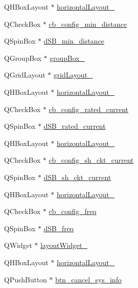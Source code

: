 \begin{DoxyCompactItemize}
\item 
Q\+H\+Box\+Layout $\ast$ \hyperlink{a00027_a8ead8fc876ee91c30864822eedb9c370}{horizontal\+Layout\+\_}
\item 
Q\+Check\+Box $\ast$ \hyperlink{a00027_a6b0d09f3b380fdb810d3da3f5208ccf5}{cb\+\_\+config\+\_\+min\+\_\+distance}
\item 
Q\+Spin\+Box $\ast$ \hyperlink{a00027_a01c23085590f4947828948bbd9f50cc7}{d\+S\+B\+\_\+min\+\_\+distance}
\item 
Q\+Group\+Box $\ast$ \hyperlink{a00027_a269faaef68e4ad4784635810fcae5698}{group\+Box\+\_}
\item 
Q\+Grid\+Layout $\ast$ \hyperlink{a00027_a20728ed83bf740332bd908ea3e15ace6}{grid\+Layout\+\_}
\item 
Q\+H\+Box\+Layout $\ast$ \hyperlink{a00027_ab48e49d68609b4c66e5169e2f87e3eb9}{horizontal\+Layout\+\_}
\item 
Q\+Check\+Box $\ast$ \hyperlink{a00027_af4863849ff58931ae3a38aa5b40b8158}{cb\+\_\+config\+\_\+rated\+\_\+current}
\item 
Q\+Spin\+Box $\ast$ \hyperlink{a00027_ab6d7c3a292c79cd73aff8735df48d30e}{d\+S\+B\+\_\+rated\+\_\+current}
\item 
Q\+H\+Box\+Layout $\ast$ \hyperlink{a00027_af1a7bbeee705545b94c55c297299118d}{horizontal\+Layout\+\_}
\item 
Q\+Check\+Box $\ast$ \hyperlink{a00027_a541de6e510677e572ab233f7ecc25e2c}{cb\+\_\+config\+\_\+sh\+\_\+ckt\+\_\+current}
\item 
Q\+Spin\+Box $\ast$ \hyperlink{a00027_aab5fcfd5ceedb9c4e853139113f5c753}{d\+S\+B\+\_\+sh\+\_\+ckt\+\_\+current}
\item 
Q\+H\+Box\+Layout $\ast$ \hyperlink{a00027_a9ab91d59aada4ff82309b36c9d5a0fa6}{horizontal\+Layout\+\_}
\item 
Q\+Check\+Box $\ast$ \hyperlink{a00027_a8f501acefacd6343a4ec99a67172f256}{cb\+\_\+config\+\_\+freq}
\item 
Q\+Spin\+Box $\ast$ \hyperlink{a00027_abd528de839feccc001dc62b3aecddc9f}{d\+S\+B\+\_\+freq}
\item 
Q\+Widget $\ast$ \hyperlink{a00027_a185129091df0a390d82417f2f52cb80f}{layout\+Widget\+\_}
\item 
Q\+H\+Box\+Layout $\ast$ \hyperlink{a00027_a488ae2286c0922552e7a39a756e337d3}{horizontal\+Layout\+\_}
\item 
Q\+Push\+Button $\ast$ \hyperlink{a00027_a72415fe77c8f6eb7b13d16177a14b39a}{btn\+\_\+cancel\+\_\+sys\+\_\+info}
\item 

\end{DoxyCompactItemize}
